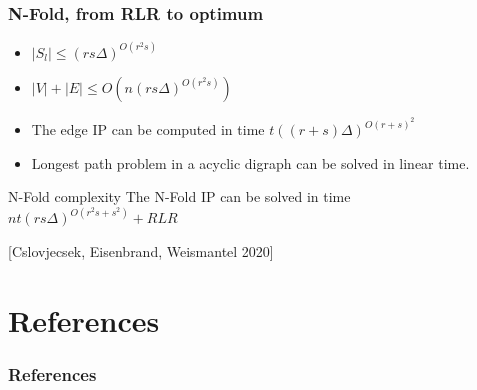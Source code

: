 \documentclass{beamer}
\begin{document}
    
    \begin{frame}
        \frametitle{N-Fold, from RLR to optimum}
        \begin{itemize}
            \item $|S_l| \leq (rs\Delta)^{O(r^2s)}$
            \item $|V| + |E| \leq O(n(rs\Delta)^{O(r^2s)})$
            \item The edge IP can be computed in time $t((r + s)\Delta)^{O(r + s)^2}$
            \item Longest path problem in a acyclic digraph can be solved in linear time.
        \end{itemize}
        \vspace{1cm}
        \begin{block}{N-Fold complexity}
            The N-Fold IP can be solved in time $nt(rs\Delta)^{O(r^2s + s^2)} + RLR$
        \end{block}
        [Cslovjecsek, Eisenbrand, Weismantel 2020]
    \end{frame}
    
    \section{References}
    \begin{frame}[allowframebreaks] %
        \frametitle{References}
        \nocite{*}
        \printbibliography
    \end{frame}
\end{document}
